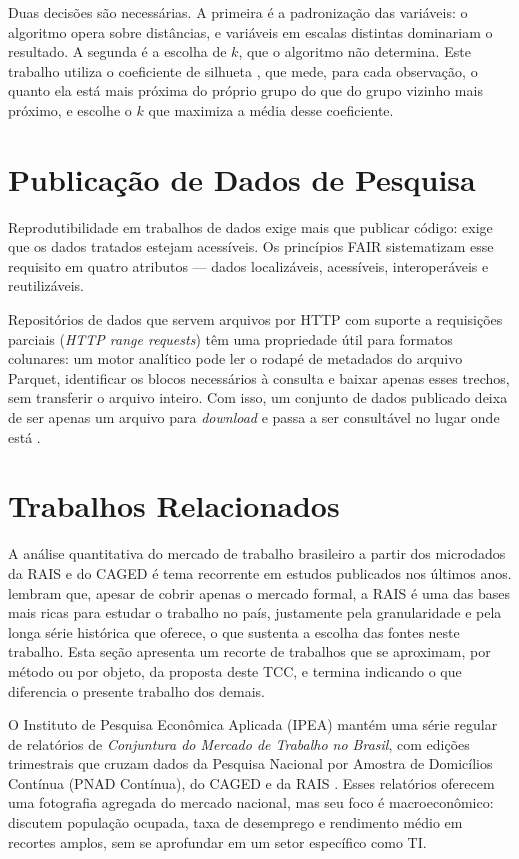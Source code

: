 Duas decisões são necessárias. A primeira é a padronização das variáveis: o algoritmo opera sobre distâncias, e variáveis em escalas distintas dominariam o resultado. A segunda é a escolha de $k$, que o algoritmo não determina. Este trabalho utiliza o coeficiente de silhueta \cite{Rousseeuw1987}, que mede, para cada observação, o quanto ela está mais próxima do próprio grupo do que do grupo vizinho mais próximo, e escolhe o $k$ que maximiza a média desse coeficiente.

\section{Publicação de Dados de Pesquisa}
\label{sec:fair}

Reprodutibilidade em trabalhos de dados exige mais que publicar código: exige que os dados tratados estejam acessíveis. Os princípios FAIR \cite{WilkinsonFair2016} sistematizam esse requisito em quatro atributos --- dados localizáveis, acessíveis, interoperáveis e reutilizáveis.

Repositórios de dados que servem arquivos por HTTP com suporte a requisições parciais (\textit{HTTP range requests}) têm uma propriedade útil para formatos colunares: um motor analítico pode ler o rodapé de metadados do arquivo Parquet, identificar os blocos necessários à consulta e baixar apenas esses trechos, sem transferir o arquivo inteiro. Com isso, um conjunto de dados publicado deixa de ser apenas um arquivo para \textit{download} e passa a ser consultável no lugar onde está \cite{HuggingFaceDatasets2026}.

\section{Trabalhos Relacionados}
\label{sec:relacionados}

A análise quantitativa do mercado de trabalho brasileiro a partir dos microdados da RAIS e do CAGED é tema recorrente em estudos publicados nos últimos anos.  lembram que, apesar de cobrir apenas o mercado formal, a RAIS é uma das bases mais ricas para estudar o trabalho no país, justamente pela granularidade e pela longa série histórica que oferece, o que sustenta a escolha das fontes neste trabalho. Esta seção apresenta um recorte de trabalhos que se aproximam, por método ou por objeto, da proposta deste TCC, e termina indicando o que diferencia o presente trabalho dos demais.

O Instituto de Pesquisa Econômica Aplicada (IPEA) mantém uma série regular de relatórios de \textit{Conjuntura do Mercado de Trabalho no Brasil}, com edições trimestrais que cruzam dados da Pesquisa Nacional por Amostra de Domicílios Contínua (PNAD Contínua), do CAGED e da RAIS \cite{IPEA2023}. Esses relatórios oferecem uma fotografia agregada do mercado nacional, mas seu foco é macroeconômico: discutem população ocupada, taxa de desemprego e rendimento médio em recortes amplos, sem se aprofundar em um setor específico como TI.

